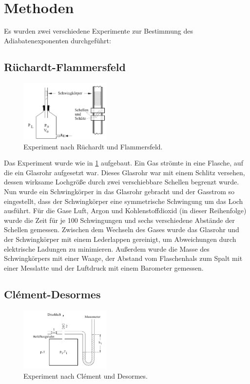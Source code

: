 \documentclass[
	a4paper,
	12pt,
	pagesize,
	ngerman
]{scrartcl}
\begin{document}
	\section{Methoden} \label{sec_Methoden}
	Es wurden zwei verschiedene Experimente zur Bestimmung des Adiabatenexponenten durchgeführt:
	\subsection{Rüchardt-Flammersfeld}
	
	\begin{figure}[H]
		\includegraphics[width=0.4\textwidth]{flammer}
		\centering
		\caption{Experiment nach Rüchardt und Flammersfeld. \cite{abbildungen}}
		\label{aufbau_flammer}
		\centering
	\end{figure} 

	Das Experiment wurde wie in \cref{aufbau_flammer} aufgebaut.
	Ein Gas strömte in eine Flasche, auf die ein Glasrohr aufgesetzt war.
	Dieses Glasrohr war mit einem Schlitz versehen, dessen wirksame Lochgröße durch zwei verschiebbare Schellen begrenzt wurde.
	Nun wurde ein Schwingkörper in das Glasrohr gebracht und der Gasstrom so eingestellt, dass der Schwingkörper eine symmetrische Schwingung um das Loch ausführt.
	Für die Gase Luft, Argon und Kohlenstoffdioxid (in dieser Reihenfolge) wurde die Zeit für je 100 Schwingungen und sechs verschiedene Abstände der Schellen gemessen.
	Zwischen dem Wechseln des Gases wurde das Glasrohr und der Schwingkörper mit einem Lederlappen gereinigt, um Abweichungen durch elektrische Ladungen zu minimieren.
	Außerdem wurde die Masse des Schwingkörpers mit einer Waage, der Abstand vom Flaschenhals zum Spalt mit einer Messlatte und der Luftdruck mit einem Barometer gemessen.
	
	\subsection{Clément-Desormes}
	
	\begin{figure}[H]
		\includegraphics[width=0.4\textwidth]{clement}
		\centering
		\caption{Experiment nach Clément und Desormes. \cite{abbildungen}} %
		\label{aufbau_clement}
		\centering
	\end{figure} 
	
\end{document}
